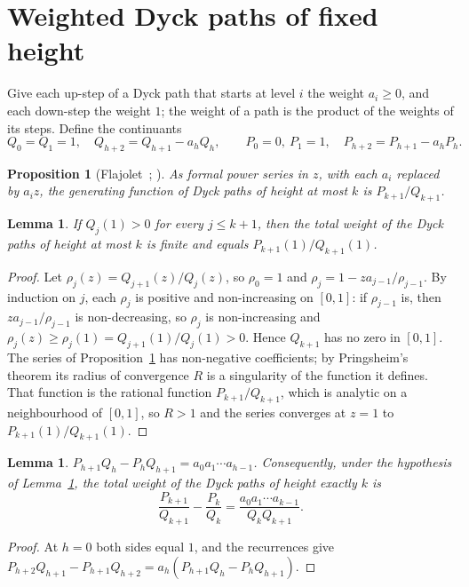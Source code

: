 \documentclass[11pt]{amsart}
\newtheorem{proposition}[theorem]{Proposition}
\newtheorem{lemma}[theorem]{Lemma}
\theoremstyle{definition}
\theoremstyle{remark}
\begin{document}
\section{Weighted Dyck paths of fixed height}\label{sec:dyck}

Give each up-step of a Dyck path that starts at level $i$ the weight $a_i\ge0$, and each down-step the
weight $1$; the weight of a path is the product of the weights of its steps. Define the continuants
\[
Q_0=Q_1=1,\quad Q_{h+2}=Q_{h+1}-a_hQ_h,\qquad P_0=0,\ P_1=1,\quad P_{h+2}=P_{h+1}-a_hP_h.
\]

\begin{proposition}[Flajolet~{\cite{Fla80}}; {\cite[Proposition~V.3(ii)]{FS09}}]\label{prop:cf}
As formal power series in $z$, with each $a_i$ replaced by $a_iz$, the generating function of Dyck
paths of height at most $k$ is $P_{k+1}/Q_{k+1}$.
\end{proposition}

\begin{lemma}\label{lem:eval}
If $Q_j(1)>0$ for every $j\le k+1$, then the total weight of the Dyck paths of height at most $k$ is
finite and equals $P_{k+1}(1)/Q_{k+1}(1)$.
\end{lemma}

\begin{proof}
Let $\rho_j(z)=Q_{j+1}(z)/Q_j(z)$, so $\rho_0=1$ and $\rho_j=1-za_{j-1}/\rho_{j-1}$. By induction on
$j$, each $\rho_j$ is positive and non-increasing on $[0,1]$: if $\rho_{j-1}$ is, then
$za_{j-1}/\rho_{j-1}$ is non-decreasing, so $\rho_j$ is non-increasing and
$\rho_j(z)\ge\rho_j(1)=Q_{j+1}(1)/Q_j(1)>0$. Hence $Q_{k+1}$ has no zero in $[0,1]$. The series of
Proposition~\ref{prop:cf} has non-negative coefficients; by Pringsheim's theorem
\cite[Theorem~IV.6]{FS09} its radius of convergence $R$ is a singularity of the function it defines.
That function is the rational function $P_{k+1}/Q_{k+1}$, which is analytic on a neighbourhood of
$[0,1]$, so $R>1$ and the series converges at $z=1$ to $P_{k+1}(1)/Q_{k+1}(1)$.
\end{proof}

\begin{lemma}\label{lem:casoratian}
$P_{h+1}Q_h-P_hQ_{h+1}=a_0a_1\cdots a_{h-1}$. Consequently, under the hypothesis of
Lemma~\ref{lem:eval}, the total weight of the Dyck paths of height exactly $k$ is
\[
\frac{P_{k+1}}{Q_{k+1}}-\frac{P_k}{Q_k}=\frac{a_0a_1\cdots a_{k-1}}{Q_kQ_{k+1}}.
\]
\end{lemma}

\begin{proof}
At $h=0$ both sides equal $1$, and the recurrences give
$P_{h+2}Q_{h+1}-P_{h+1}Q_{h+2}=a_h(P_{h+1}Q_h-P_hQ_{h+1})$.
\end{proof}
\end{document}
